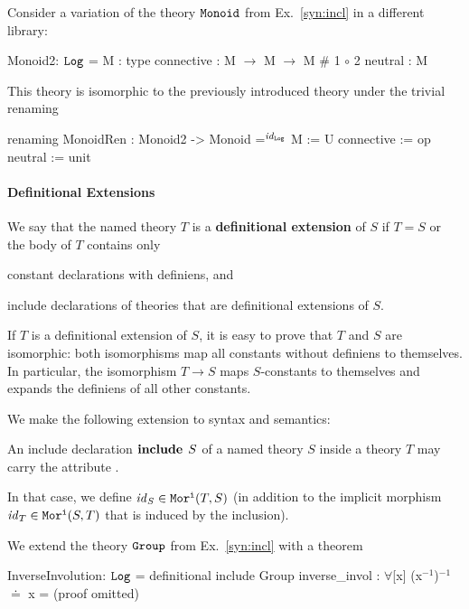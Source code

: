 \begin{example}[Renaming]
Consider a variation of the theory $\operatorname{\mathtt{Monoid}}$ from Ex.~\ref{syn:incl} in a different library:
\begin{mmtcode}
Monoid2: $\operatorname{\mathtt{Log}}$ =
  M          : type
  connective : M $\to$ M $\to$ M	 # 1 $\circ$ 2 
  neutral    : M
\end{mmtcode}
This theory is isomorphic to the previously introduced theory  under the trivial renaming
	\begin{mmtcode}
renaming MonoidRen : Monoid2 -> Monoid =$^{\mathit{id}_{\operatorname{\mathtt{Log}}}}$
  M          := U
  connective := op 
  neutral    := unit
\end{mmtcode}
\end{example}

\paragraph{Definitional Extensions}
We say that the named theory $T$ is a \textbf{definitional extension} of $S$ if $T=S$ or the body of $T$ contains only
\begin{compactitem}
 \item constant declarations with definiens, and
 \item include declarations of theories that are definitional extensions of $S$.
\end{compactitem}

If $T$ is a definitional extension of $S$, it is easy to prove that $T$ and $S$ are isomorphic: both isomorphisms map all constants without definiens to themselves. In particular, the isomorphism $T\to S$ maps $S$-constants to themselves and expands the definiens of all other constants.

We make the following extension to syntax and semantics:
\begin{compactitem}
  \item An include declaration $\operatorname{\mathbf{include}}{\;S}$ of a named theory $S$ inside a theory $T$ may carry the attribute .
  \item In that case, we define $\mathit{id}_{S}\in\mathtt{Mor^i}(T,S)$ (in addition to the implicit morphism $\mathit{id}_{T}\in\mathtt{Mor^i}(S,T)$ that is induced by the inclusion).
\end{compactitem}

\begin{example}
We extend the theory $\operatorname{\mathtt{Group}}$ from Ex.~\ref{syn:incl} with a theorem
\begin{mmtcode}
InverseInvolution: $\operatorname{\mathtt{Log}}$ =
  definitional include Group
  inverse_invol : $\forall$[x] (x$^{-1}$)$^{-1}$$\doteq$ x  =  (proof omitted)
\end{mmtcode}
\end{example}

